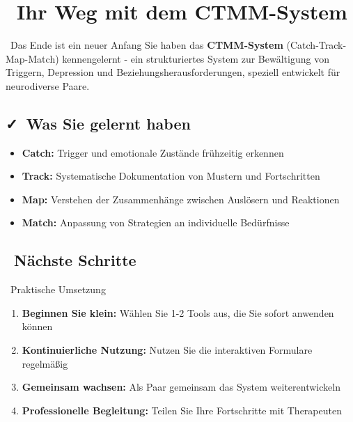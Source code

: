 \documentclass[a4paper,12pt]{article}
\begin{document}
\newpage
\section*{\textcolor{ctmmBlue}{\faHeart~Ihr Weg mit dem CTMM-System}}

\begin{ctmmBlueBox}{\faCompass~Das Ende ist ein neuer Anfang}
Sie haben das \textbf{CTMM-System} (Catch-Track-Map-Match) kennengelernt - ein strukturiertes System zur Bewältigung von Triggern, Depression und Beziehungsherausforderungen, speziell entwickelt für neurodiverse Paare.
\end{ctmmBlueBox}

\subsection*{\faCheck~Was Sie gelernt haben}
\begin{itemize}
    \item \textcolor{ctmmBlue}{\textbf{Catch:}} Trigger und emotionale Zustände frühzeitig erkennen
    \item \textcolor{ctmmGreen}{\textbf{Track:}} Systematische Dokumentation von Mustern und Fortschritten
    \item \textcolor{ctmmOrange}{\textbf{Map:}} Verstehen der Zusammenhänge zwischen Auslösern und Reaktionen
    \item \textcolor{ctmmPurple}{\textbf{Match:}} Anpassung von Strategien an individuelle Bedürfnisse
\end{itemize}

\subsection*{\faRocket~Nächste Schritte}
\begin{ctmmGreenBox}{\faLightbulb~Praktische Umsetzung}
\begin{enumerate}
    \item \textbf{Beginnen Sie klein:} Wählen Sie 1-2 Tools aus, die Sie sofort anwenden können
    \item \textbf{Kontinuierliche Nutzung:} Nutzen Sie die interaktiven Formulare regelmäßig
    \item \textbf{Gemeinsam wachsen:} Als Paar gemeinsam das System weiterentwickeln
    \item \textbf{Professionelle Begleitung:} Teilen Sie Ihre Fortschritte mit Therapeuten
\end{enumerate}
\end{ctmmGreenBox}
\end{document}
